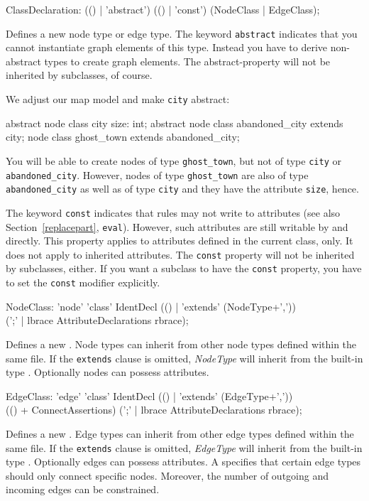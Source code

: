 \begin{rail}  
  ClassDeclaration: (() | 'abstract') (() | 'const') (NodeClass | EdgeClass);
\end{rail}
Defines a new node type or edge type. The keyword \texttt{abstract} indicates that you cannot instantiate graph elements of this type. Instead you have to derive non-abstract types to create graph elements. The abstract-property will not be inherited by subclasses, of course.

\begin{example}
We adjust our map model and make \texttt{city} abstract:
\begin{grgen}
abstract node class city {
	size: int;
}
abstract node class abandoned_city extends city;
node class ghost_town extends abandoned_city;
\end{grgen}
You will be able to create nodes of type \texttt{ghost\_town}, but not of type \texttt{city} or \texttt{abandoned\_city}. However, nodes of type \texttt{ghost\_town} are also of type \texttt{abandoned\_city} as well as of type \texttt{city} and they have the attribute \texttt{size}, hence.
\end{example}
The keyword \texttt{const} indicates that rules may not write to attributes (see also Section~\ref{replacepart}, \texttt{eval}). However, such attributes are still writable by \LibGr{} and \GrShell{} directly. This property applies to attributes defined in the current class, only. It does not apply to inherited attributes. The \texttt{const} property will not be inherited by subclasses, either. If you want a subclass to have the \texttt{const} property, you have to set the \texttt{const} modifier explicitly.

\begin{rail}  
  NodeClass: 'node' 'class' IdentDecl (() | 'extends' (NodeType+',')) \\ 
    (';' | lbrace AttributeDeclarations rbrace);
\end{rail}
Defines a new . Node types can inherit from other node types defined within the same file. If the \texttt{extends} clause is omitted, \emph{NodeType} will inherit from the built-in type \texttt{}. Optionally nodes can possess attributes.

\begin{rail}    
  EdgeClass: 'edge' 'class' IdentDecl (() | 'extends' (EdgeType+',')) \\
    (() + ConnectAssertions) (';' | lbrace AttributeDeclarations rbrace);
\end{rail}
Defines a new . Edge types can inherit from other edge types defined within the same file. If the \texttt{extends} clause is omitted, \emph{EdgeType} will inherit from the built-in type \texttt{}. Optionally edges can possess attributes. A  specifies that certain edge types should only connect specific nodes. Moreover, the number of outgoing and incoming edges can be constrained.

